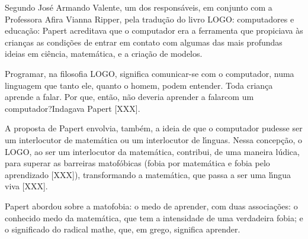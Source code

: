 \documentclass[
12pt,		%
openright,	%
twoside,  %
a4paper,			%
chapter=TITLE,		%
english,			%
french,				%
spanish,			%
brazil				%
]{USPSC-classe/USPSC}
\begin{document}
Segundo Jos\'e Armando Valente, um dos respons\'aveis, em conjunto com a Professora Afira Vianna Ripper, pela tradu\c{c}\~ao do livro LOGO: computadores e educa\c{c}\~ao: \textquotedbl Papert acreditava que o computador era a ferramenta que propiciava \`as crian\c{c}as as condi\c{c}\~oes de entrar em contato com algumas das mais profundas ideias em ci\^encia, matem\'atica, e a cria\c{c}\~ao de modelos\textquotedbl .




Programar, na filosofia LOGO, significa \textquotedbl comunicar-se com o computador, numa linguagem que tanto ele, quanto o homem,  podem entender\textquotedbl . Toda crian\c{c}a aprende a falar. Por que, ent\~ao, n\~ao deveria aprender a \textquotedbl falar\textquotedbl  com um computador?\textquotedbl  Indagava Papert [XXX].




A proposta de Papert envolvia, tamb\'em, a ideia de que o computador pudesse ser um interlocutor  de matem\'atica ou um interlocutor de l\'{\i}nguas. Nessa concep\c{c}\~ao, o LOGO, ao ser um interlocutor da matem\'atica, contribui, de uma maneira l\'udica, para superar as barreiras matof\'obicas (fobia por matem\'atica e fobia pelo aprendizado [XXX]), transformando a matem\'atica, que passa a ser uma l\'{\i}ngua viva [XXX].




Papert abordou sobre a \textquotedbl matofobia: o medo de aprender\textquotedbl , com duas associa\c{c}\~oes: o conhecido medo da matem\'atica, que tem a intensidade de uma verdadeira fobia; e o  significado do radical mathe, que, em grego, significa aprender.





\noindent\begin{center}\mbox{\centering{}}\end{center}
\end{document}
